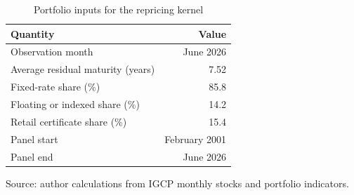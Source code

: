 \begin{table}[H]
\centering
\caption{Portfolio inputs for the repricing kernel}
\label{tab:repricing-portfolio}
\begin{tabular}{lr}
\toprule
Quantity & Value \\
\midrule
Observation month & June 2026 \\
Average residual maturity (years) & 7.52 \\
Fixed-rate share (\%) & 85.8 \\
Floating or indexed share (\%) & 14.2 \\
Retail certificate share (\%) & 15.4 \\
Panel start & February 2001 \\
Panel end & June 2026 \\
\bottomrule
\end{tabular}
\par\smallskip
\parbox{0.92\textwidth}{\small Source: author calculations from IGCP monthly stocks and portfolio indicators.}
\end{table}
